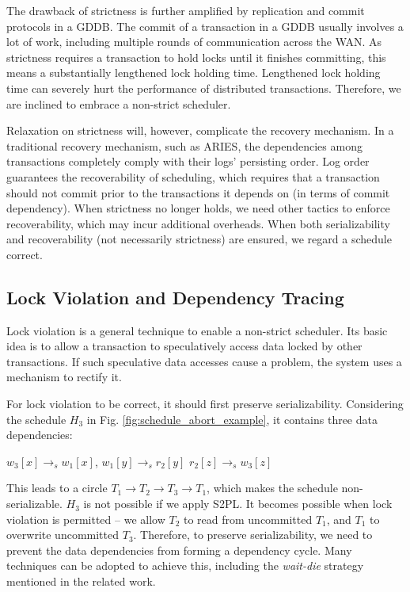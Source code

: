 \documentclass[conference]{IEEEtran}
\begin{document}
The drawback of strictness is further amplified by replication and commit protocols in a GDDB.
The commit of a transaction in a GDDB usually involves a lot of work, including multiple rounds of communication across the WAN.
As strictness requires a transaction to hold locks until it finishes committing, this means a substantially lengthened lock holding time.
Lengthened lock holding time can severely hurt the performance of distributed transactions.
Therefore, we are inclined to embrace a non-strict scheduler.

Relaxation on strictness will, however, complicate the recovery mechanism.
In a traditional recovery mechanism, such as ARIES, the dependencies among transactions completely comply with their logs' persisting order.
Log order guarantees the recoverability of scheduling, which requires that a transaction should not commit prior to the transactions it depends on (in terms of commit dependency).
When strictness no longer holds, we need other tactics to enforce recoverability, which may incur additional overheads.
When both serializability and recoverability (not necessarily strictness) are ensured, we regard a schedule correct.

\subsection{Lock Violation and Dependency Tracing}

Lock violation is a general technique to enable a non-strict scheduler.
Its basic idea is to allow a transaction to speculatively access data locked by other transactions.
If such speculative data accesses cause a problem, the system uses a mechanism to rectify it.

For lock violation to be correct, it should first preserve serializability.
Considering the schedule ${H_3}$ in Fig. \ref{fig:schedule_abort_example},
it contains three data dependencies:

\begin{center}
${w_3[x] \rightarrow _s w_1[x]}$,
${w_1[y] \rightarrow _s r_2[y]}$
${r_2[z] \rightarrow _s w_3[z]}$
\end{center}

This leads to a circle ${T_1 \rightarrow T_2 \rightarrow T_3 \rightarrow T_1}$, which makes the schedule non-serializable.
${H_3}$ is not possible if we apply S2PL.
It becomes possible when lock violation is permitted -- we allow ${T_2}$ to read from uncommitted ${T_1}$, and ${T_1}$ to overwrite uncommitted ${T_3}$.
Therefore, to preserve serializability, we need to prevent the data dependencies from forming a dependency cycle.
Many techniques can be adopted to achieve this, including the \emph{wait-die} strategy mentioned in the related work.
\end{document}
